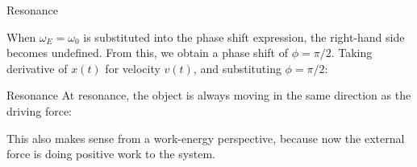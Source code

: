 \documentclass[12pt,compress,aspectratio=169]{beamer}
\begin{document}
\begin{frame}{Resonance}


  When $\omega_E=\omega_0$ is substituted into the phase shift
  expression, the
  right-hand side becomes undefined. From this, we obtain a phase shift of
  $\phi=\pi/2$. Taking derivative of $x(t)$ for velocity $v(t)$, and
  substituting $\phi=\pi/2$:
  
\end{frame}



\begin{frame}{Resonance}
  At resonance, the object is always moving in the same direction as the
  driving force:

  \vspace{-.4in}{\Large
    \begin{align*}
      v(t)&=A\omega_E\cos(\omega_E t)\\
      F_E(t)&=F\cos(\omega_E t)
    \end{align*}
  }

  \vspace{-.2in}This also makes sense from a work-energy perspective, because
  now the external force is doing positive work to the system.
\end{frame}
\end{document}

